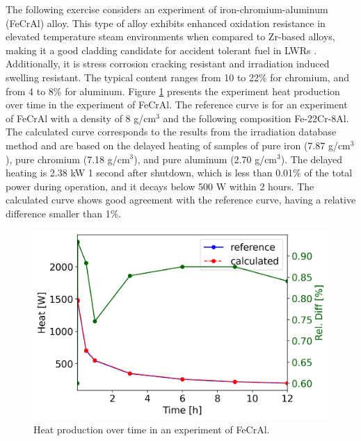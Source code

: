 The following exercise considers an experiment of iron-chromium-aluminum (FeCrAl) alloy.
This type of alloy exhibits enhanced oxidation resistance in elevated temperature steam environments when compared to Zr-based alloys, making it a good cladding candidate for accident tolerant fuel in \glspl*{LWR} \cite{field_accident_2017}.
Additionally, it is stress corrosion cracking resistant and irradiation induced swelling resistant.
The typical content ranges from 10 to 22\% for chromium, and from 4 to 8\% for aluminum.
Figure \ref{fig:atr-time-fecral} presents the experiment heat production over time in the experiment of FeCrAl.
The reference curve is for an experiment of FeCrAl with a density of 8 g/cm$^3$ and the following composition Fe-22Cr-8Al.
The calculated curve corresponds to the results from the irradiation database method and are based on the delayed heating of samples of pure iron (7.87 g/cm$^3$), pure chromium (7.18 g/cm$^3$), and pure aluminum (2.70 g/cm$^3$).
The delayed heating is 2.38 kW 1 second after shutdown, which is less than 0.01\% of the total power during operation, and it decays below 500 W within 2 hours.
The calculated curve shows good agreement with the reference curve, having a relative difference smaller than 1\%.

\begin{figure}[htbp!] %
    \centering
    \includegraphics[width=0.60\linewidth]{figures/FeCrAl1-tot-vs-t}
    \hfill
    \caption{Heat production over time in an experiment of FeCrAl.}
    \label{fig:atr-time-fecral}
\end{figure}

